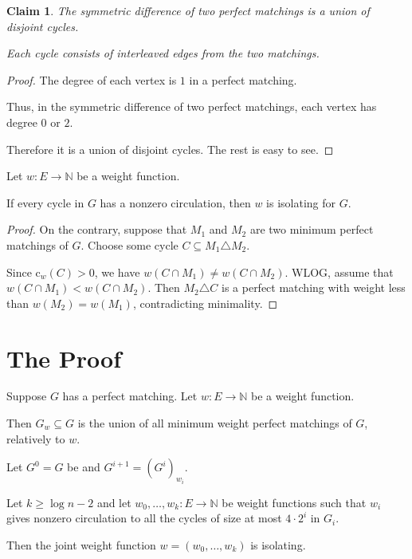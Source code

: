 \documentclass{beamer}
\newtheorem{claim}{Claim}
\theoremstyle{remark}
\newcommand{\nn}{\mathbb{N}}
\newcommand{\cl}{\text{c}}
\begin{document}
\begin{frame}
  \begin{claim}
    The symmetric difference of two perfect matchings is a union of
    disjoint cycles.

    Each cycle consists of interleaved edges from the two matchings.
  \end{claim}

  \begin{proof}
    The degree of each vertex is $1$ in a perfect matching.

    Thus, in the symmetric difference of two perfect matchings, each
    vertex has degree $0$ or $2$.

    Therefore it is a union of disjoint cycles. The rest is easy to see.
  \end{proof}
\end{frame}
\begin{frame}
  \begin{lemma}
    Let $w : E \to \nn$ be a weight function.

    If every cycle in $G$ has a nonzero circulation, then $w$ is
    isolating for $G$.
  \end{lemma}

  \begin{proof}
    On the contrary, suppose that $M_1$ and $M_2$ are two minimum
    perfect matchings of $G$.
    Choose some cycle $C \subseteq M_1 \triangle M_2$.

    Since $\cl_w(C) > 0$, we have $w(C \cap M_1) \ne w(C \cap M_2)$.
    WLOG, assume that $w(C \cap M_1) < w(C \cap M_2)$.
    Then $M_2 \triangle C$ is a perfect matching with weight less than
    $w(M_2) = w(M_1)$,
    contradicting minimality.
  \end{proof}
\end{frame}

\section{The Proof}

\begin{frame}
  \begin{definition}
    Suppose $G$ has a perfect matching. Let $w : E \to \nn$ be a weight function.

    Then $G_w \subseteq G$ is the union of all minimum weight
    perfect matchings of $G$, relatively to $w$.
  \end{definition}

  \begin{theorem}
    Let $G^0 = G$ be and $G^{i+1} = {\left(G^{i}\right)}_{w_i}$.

    Let $k \ge \log n - 2$ and let $w_0, \ldots, w_k : E \to \nn$ be weight functions
    such that $w_i$ gives nonzero circulation to all the
    cycles of size at most $4 \cdot 2^i$ in $G_{i}$.

    Then the joint weight function $w = (w_0, \ldots, w_k)$ is isolating.
  \end{theorem}
\end{frame}
\end{document}
